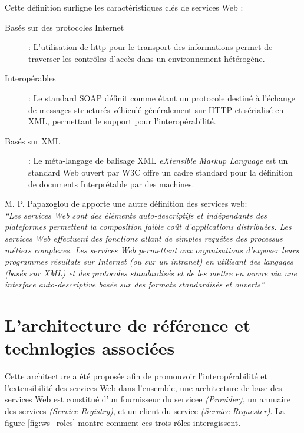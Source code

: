 Cette définition surligne les caractéristiques clés de services Web
\cite{fremantle2002enterprise}:

\renewcommand{\descriptionlabel}[1]{\hspace{1cm}\textbullet~\textsf{#1}}
\begin{description}
\item[Basés sur des protocoles Internet] : L'utilisation de
  \acrshort{http} pour le transport des informations permet de
  traverser les contrôles d'accès dans un environnement hétérogène.

\item[Interopérables] : Le standard \textsc{SOAP} \cite{box2000simple}
  définit comme étant un protocole destiné à l'échange de messages
  structurés véhiculé généralement sur \textsc{HTTP} et sérialisé en
  \textsc{XML}, permettant le support pour l'interopérabilité.

\item[Basés sur XML] : Le méta-langage de balisage \textsc{XML}
  \textit{eXtensible Markup Language} est un standard Web ouvert par
  \textsc{W3C} \cite{bray1998extensible} offre un cadre standard pour
  la définition de documents Interprétable par des machines.
\end{description}

M. P. Papazoglou \cite{papazoglou2003service} de apporte une
autre définition des services web:\\ \emph{``Les services Web sont
des éléments auto-descriptifs et indépendants des plateformes
permettent la composition faible coût d’applications
distribuées. Les services Web effectuent des fonctions allant de
simples requêtes des processus métiers complexes. Les services Web
permettent aux organisations d’exposer leurs programmes résultats
sur Internet (ou sur un intranet) en utilisant des langages (basés
sur XML) et des protocoles standardisés et de les mettre en œuvre
via une interface auto-descriptive basée sur des formats
standardisés et ouverts''}


% 

\section{L'architecture de référence et technlogies associées}
\label{sec:reference-arch}
Cette architecture a été proposée afin de promouvoir
l'interopérabilité et l'extensibilité des services Web dans
l'ensemble, une architecture de base des services Web est constitué
d'un fournisseur du servicee \textit{(Provider)}, un annuaire des
services \textit{(Service Registry)}, et un client du service
\textit{(Service Requester)}. La figure \ref{fig:ws_roles} montre
comment ces trois rôles interagissent.

